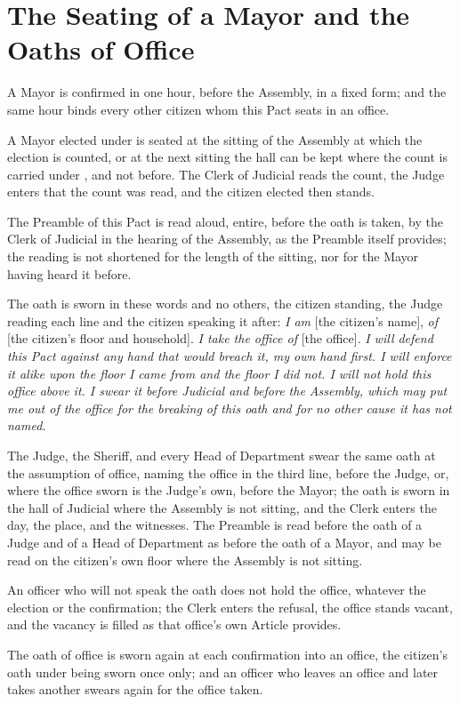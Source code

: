 \section{The Seating of a Mayor and the Oaths of Office}
\label{sec:mayor:seating-of-a-mayor-and-the-oaths-of-office}

A Mayor is confirmed in one hour, before the Assembly, in a fixed form; and the same hour binds every other citizen whom this Pact seats in an office.

\begin{clauses}
\item A Mayor elected under  is seated at the sitting of the Assembly at which the election is counted, or at the next sitting the hall can be kept where the count is carried under , and not before. The Clerk of Judicial reads the count, the Judge enters that the count was read, and the citizen elected then stands.
\item The Preamble of this Pact is read aloud, entire, before the oath is taken, by the Clerk of Judicial in the hearing of the Assembly, as the Preamble itself provides; the reading is not shortened for the length of the sitting, nor for the Mayor having heard it before.
\item The oath is sworn in these words and no others, the citizen standing, the Judge reading each line and the citizen speaking it after: \emph{I am} [the citizen's name], \emph{of} [the citizen's floor and household]. \emph{I take the office of} [the office]. \emph{I will defend this Pact against any hand that would breach it, my own hand first. I will enforce it alike upon the floor I came from and the floor I did not. I will not hold this office above it. I swear it before Judicial and before the Assembly, which may put me out of the office for the breaking of this oath and for no other cause it has not named.}
\item The Judge, the Sheriff, and every Head of Department swear the same oath at the assumption of office, naming the office in the third line, before the Judge, or, where the office sworn is the Judge's own, before the Mayor; the oath is sworn in the hall of Judicial where the Assembly is not sitting, and the Clerk enters the day, the place, and the witnesses. The Preamble is read before the oath of a Judge and of a Head of Department as before the oath of a Mayor, and may be read on the citizen's own floor where the Assembly is not sitting.
\item An officer who will not speak the oath does not hold the office, whatever the election or the confirmation; the Clerk enters the refusal, the office stands vacant, and the vacancy is filled as that office's own Article provides.
\item The oath of office is sworn again at each confirmation into an office, the citizen's oath under  being sworn once only; and an officer who leaves an office and later takes another swears again for the office taken.
\end{clauses}
